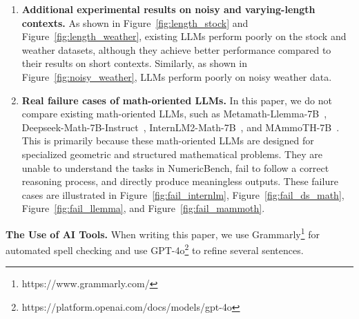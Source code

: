 \begin{enumerate}[leftmargin=*]
	\item \textbf{Additional experimental results on noisy and varying-length contexts.}  
	As shown in Figure~\ref{fig:length_stock} and Figure~\ref{fig:length_weather}, existing LLMs perform poorly on the stock and weather datasets, although they achieve better performance compared to their results on short contexts. 
	Similarly, as shown in Figure~\ref{fig:noisy_weather}, LLMs perform poorly on noisy weather data.
 
 \item \textbf{Real failure cases of math-oriented LLMs.} In this paper, we do not compare existing math-oriented LLMs, such as Metamath-Llemma-7B~\citep{yu2023metamath}, Deepseek-Math-7B-Instruct~\citep{deepseek-math}, InternLM2-Math-7B~\citep{ying2024internlmmathopenmathlarge}, and MAmmoTH-7B~\citep{yue2023mammoth}. 
 This is primarily because these math-oriented LLMs are designed for specialized geometric and structured mathematical problems. They are unable to understand the tasks in NumericBench, fail to follow a correct reasoning process, and directly produce meaningless outputs. These failure cases are illustrated in Figure~\ref{fig:fail_internlm}, Figure~\ref{fig:fail_ds_math}, Figure~\ref{fig:fail_llemma}, and Figure~\ref{fig:fail_mammoth}.
 
\end{enumerate}

\noindent \textbf{The Use of AI Tools.} When writing  this paper, we use Grammarly\footnote{https://www.grammarly.com/} for automated spell checking and use GPT-4o\footnote{https://platform.openai.com/docs/models/gpt-4o} to refine several sentences.


\clearpage
 
 

